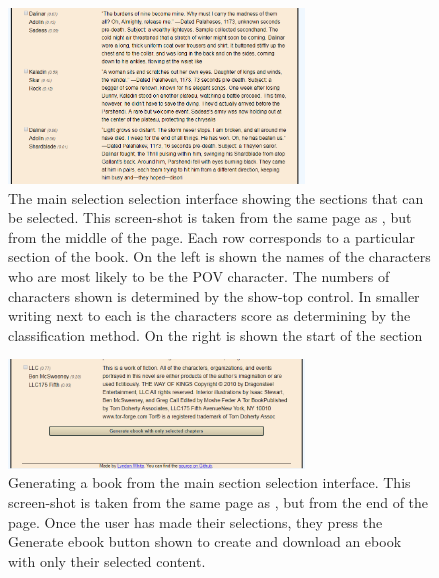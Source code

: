 \documentclass[11pt,a4paper]{article}
\begin{document}
\begin{figure}
	\centering
	\includegraphics[width=0.7\textwidth]{classmiddle}
	\caption{The main selection selection interface showing the sections that can be selected.
		This screen-shot is taken from the same page as ,
		but from the middle of the page.
		Each row corresponds to a particular section of the book.
		On the left is shown the names of the characters who are most likely to be the POV character.
		The numbers of characters shown is determined by the show-top control.
		In smaller writing next to each is the characters score as determining by the classification method.
		On the right is shown the start of the section
	}
	\label{fig:classmid}
\end{figure}

\begin{figure}
	\centering
	\includegraphics[width=0.7\textwidth]{classend}
	\caption{Generating a book from the main section selection interface.
		This screen-shot is taken from the same page as ,
		but from the end of the page.
		Once the user has made their selections,
		they press the Generate ebook button shown
		to create and download an ebook with only their selected content.}
	\label{fig:classend}
\end{figure}
\end{document}
